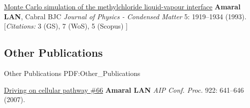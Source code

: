\NumberedItem{\makebox[0.8cm][r]{[1]}}
\href{/people/amaral/monte-carlo-simulation-of-the-methylchloride-liquid-vapor-interface}
{Monte Carlo simulation of the methylchloride liquid-vapour interface}
\newline
{\textbf{Amaral LAN}}, Cabral BJC
\newline
\textit{Journal of Physics - Condensed Matter}
    5:
1919--1934 (1993).
    \newline
    \hfill [{\em{Citations:}} 3 (GS),
    7 (WoS), 5 (Scopus)
    ]
\newline
\Gap
~
\Gap

\vspace*{0.2cm}\subsection
{Other Publications}
{Other Publications}
{PDF:Other_Publications}

\GapNoBreak
\NumberedItem{\makebox[0.8cm][r]{[1]}}
\href{/people/amaral/driving-on-cellular-pathway-66}
{Driving on cellular pathway \#66}
\newline
{\textbf{Amaral LAN}}
\newline
\textit{AIP Conf. Proc.}
    922:
641--646 (2007).
\newline
\Gap
~
\Gap

\vspace*{0.2cm}
